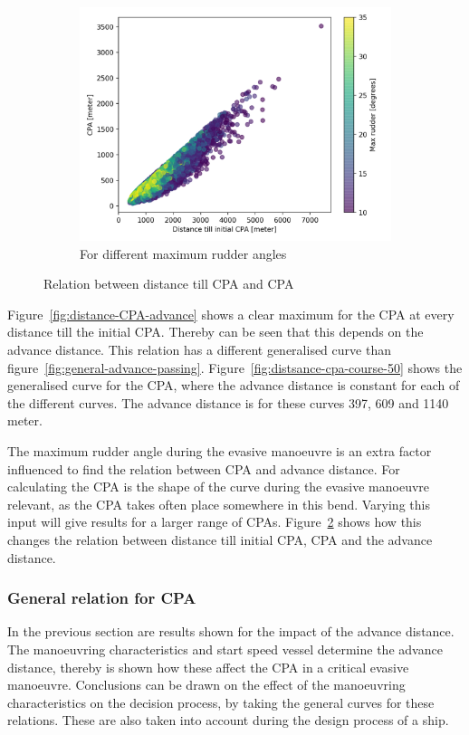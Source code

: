 \begin{figure}[!p]
\begin{subfigure}[b]{0.6\textwidth}
		\includegraphics[width=\linewidth]{figure/distance-cpa-max-rudder}
		\caption{For different maximum rudder angles}
		\label{fig:distance-cpa-max-rudder}
	\end{subfigure}
	\caption{Relation between distance till CPA and CPA}
\end{figure}

Figure~\ref{fig:distance-CPA-advance} shows a clear maximum for the CPA at every distance till the initial CPA. Thereby can be seen that this depends on the advance distance. This relation has a different generalised curve than figure~\ref{fig:general-advance-passing}. Figure~\ref{fig:distsance-cpa-course-50} shows the generalised curve for the CPA, where the advance distance is constant for each of the different curves. The advance distance is for these curves 397, 609 and 1140 meter.

\clearpage

The maximum rudder angle during the evasive manoeuvre is an extra factor influenced to find the relation between CPA and advance distance. For calculating the CPA is the shape of the curve during the evasive manoeuvre relevant, as the CPA takes often place somewhere in this bend. Varying this input will give results for a larger range of CPAs. Figure~\ref{fig:distance-cpa-max-rudder} shows how this changes the relation between distance till initial CPA, CPA and the advance distance.

\subsubsection{General relation for CPA}
In the previous section are results shown for the impact of the advance distance. The manoeuvring characteristics and start speed vessel determine the advance distance, thereby is shown how these affect the CPA in a critical evasive manoeuvre. Conclusions can be drawn on the effect of the manoeuvring characteristics on the decision process, by taking the general curves for these relations. These are also taken into account during the design process of a ship.

